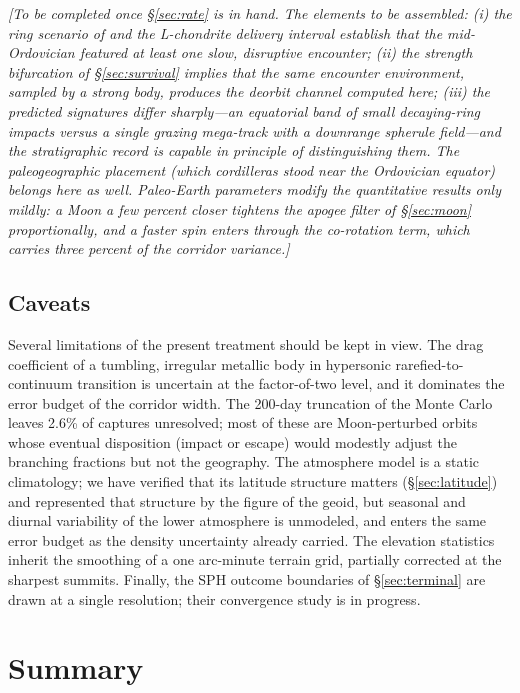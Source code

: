\documentclass[twocolumn]{aastex701}
\begin{document}
\textit{[To be completed once \S\ref{sec:rate} is in hand. The elements to
be assembled: (i) the ring scenario of \citet{tomkins2024} and the
L-chondrite delivery interval \citep{schmitz2001} establish that the
mid-Ordovician featured at least one slow, disruptive encounter; (ii) the
strength bifurcation of \S\ref{sec:survival} implies that the same
encounter environment, sampled by a strong body, produces the deorbit
channel computed here; (iii) the predicted signatures differ sharply---an
equatorial band of small decaying-ring impacts versus a single grazing
mega-track with a downrange spherule field---and the stratigraphic record
is capable in principle of distinguishing them. The paleogeographic
placement (which cordilleras stood near the Ordovician equator) belongs
here as well. Paleo-Earth parameters modify the quantitative results only
mildly: a Moon a few percent closer tightens the apogee filter of
\S\ref{sec:moon} proportionally, and a faster spin enters through the
co-rotation term, which carries three percent of the corridor variance.]}

\subsection{Caveats} \label{sec:caveats}

Several limitations of the present treatment should be kept in view.
The drag coefficient of a tumbling, irregular metallic body in hypersonic
rarefied-to-continuum transition is uncertain at the factor-of-two level,
and it dominates the error budget of the corridor width. The 200-day
truncation of the Monte Carlo leaves 2.6\% of captures unresolved; most of
these are Moon-perturbed orbits whose eventual disposition (impact or
escape) would modestly adjust the branching fractions but not the
geography. The atmosphere model is a static climatology; we have verified
that its latitude structure matters (\S\ref{sec:latitude}) and represented
that structure by the figure of the geoid, but seasonal and diurnal
variability of the lower atmosphere is unmodeled, and enters the same
error budget as the density uncertainty already carried. The elevation
statistics inherit the smoothing of a one arc-minute terrain grid,
partially corrected at the sharpest summits. Finally, the SPH outcome
boundaries of \S\ref{sec:terminal} are drawn at a single resolution;
their convergence study is in progress.

\section{Summary} \label{sec:summary}
\end{document}
